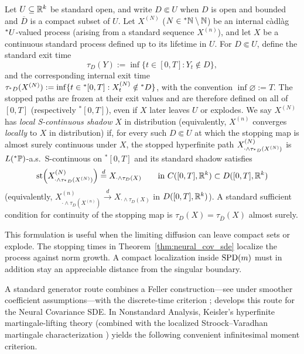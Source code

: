 \begin{definition}
\label{def:local-skorohod}
Let $U \subseteq \mathbb{R}^k$ be standard open, and write $D \Subset U$ when $D$ is open and bounded and $\overline{D}$ is a compact subset of $U$. Let $X^{(N)}$ ($N \in {}^*\mathbb{N} \setminus \mathbb{N}$) be an internal c\`adl\`ag ${}^*U$-valued process (arising from a standard sequence $X^{(n)}$), and let $X$ be a continuous standard process defined up to its lifetime in $U$. For $D \Subset U$, define the standard exit time
\begin{equation}
\label{eq:appa-exit-time}
\tau_D(Y) := \inf\{t \in [0, T] : Y_t \notin D\},
\end{equation}
and the corresponding internal exit time $\tau_{{}^*D}(X^{(N)}) := \inf\{t \in {}^*[0, T] : X_t^{(N)} \notin {}^*D\}$, with the convention $\inf \varnothing := T$. The stopped paths are frozen at their exit values and are therefore defined on all of $[0, T]$ (respectively ${}^*[0, T]$), even if $X$ later leaves $U$ or explodes. We say $X^{(N)}$ has \emph{local S-continuous shadow} $X$ in distribution (equivalently, $X^{(n)}$ converges \emph{locally} to $X$ in distribution) if, for every such $D \Subset U$ at which the stopping map is almost surely continuous under $X$, the stopped hyperfinite path $X_{\cdot \wedge \tau_{{}^*D}(X^{(N)})}^{(N)}$ is $L({}^*\mathbb{P})$-a.s.\ S-continuous on ${}^*[0, T]$ and its standard shadow satisfies
\begin{equation}
\label{eq:appa-local-stopped-conv}
\operatorname{st}\!\left(X_{\cdot \wedge \tau_{{}^*D}(X^{(N)})}^{(N)}\right) \stackrel{d}{=} X_{\cdot \wedge \tau_D(X)} \qquad \text{in } C([0, T], \mathbb{R}^k) \subset D([0, T], \mathbb{R}^k)
\end{equation}
(equivalently, $X_{\cdot \wedge \tau_D(X^{(n)})}^{(n)} \xrightarrow{d} X_{\cdot \wedge \tau_D(X)}$ in $D([0, T], \mathbb{R}^k)$). A standard sufficient condition for continuity of the stopping map is $\tau_D(X) = \tau_{\overline{D}}(X)$ almost surely.
\end{definition}

This formulation is useful when the limiting diffusion can leave compact sets or explode. The stopping times in Theorem~\ref{thm:neural_cov_sde}
localize the process against norm growth. A compact localization inside $\operatorname{SPD}(m)$ must in addition stay an appreciable distance from the singular boundary.

A standard generator route combines a Feller construction---see \cite[Chapter 8, Theorem 2.5]{ethier2009markov} under smoother coefficient assumptions---with the discrete-time criterion \cite[Theorem 17.28]{kallenberg2021foundations}; \cite[Appendix A]{li2022neural} develops this route for the Neural Covariance SDE. In Nonstandard Analysis, Keisler's hyperfinite martingale-lifting theory \cite{keisler1984infinitesimal,lindstrom1988invitation} (combined with the localized Stroock--Varadhan martingale characterization \cite{stroock1997multidimensional}) yields the following convenient infinitesimal moment criterion.

